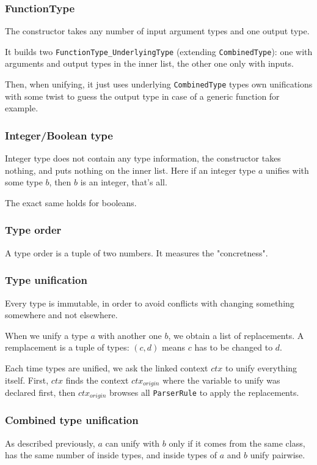 \documentclass{article}
\newcommand\cc[1]{\lstinline{#1}}
\begin{document}
			\subsubsection{FunctionType}
				The constructor takes any number of input argument types and one output type.

				It builds two  \cc{FunctionType_UnderlyingType} (extending \cc{CombinedType}): one with arguments and output types in the inner list, the other one only with inputs.

				Then, when unifying, it just uses underlying \cc{CombinedType} types own unifications with some twist to guess the output type in case of a generic function for example. 

			\subsubsection{Integer/Boolean type}
				Integer type does not contain any type information, the constructor takes nothing, and puts nothing on the inner list. Here if an integer type $a$ unifies with some type $b$, then $b$ is an integer, that's all.

				The exact same holds for booleans.

			\subsubsection{Type order}
				A type order is a tuple of two numbers. It measures the "concretness".
				
			\subsubsection{Type unification}
				Every type is immutable, in order to avoid conflicts with changing something somewhere and not elsewhere.

				When we unify a type $a$ with another one $b$, we obtain a list of replacements. A remplacement is a tuple of types: $(c,d)$ means $c$ has to be changed to $d$.

				Each time types are unified, we ask the linked context $ctx$ to unify everything itself. First, $ctx$ finds the context $ctx_{origin}$ where the variable to unify was declared first, then $ctx_{origin}$ browses all \cc{ParserRule} to apply the replacements.

			\subsubsection{Combined type unification}
				As described previously, $a$ can unify with $b$ only if it comes from the same class, has the same number of inside types, and inside types of $a$ and $b$ unify pairwise.
\end{document}
